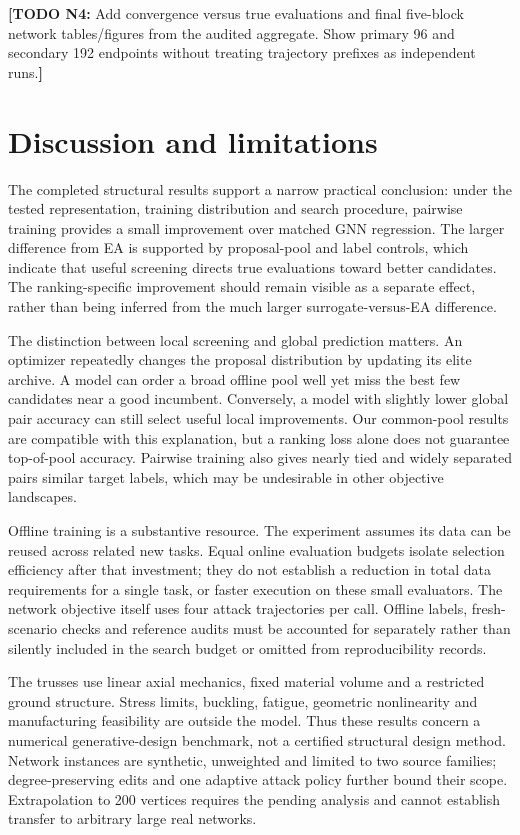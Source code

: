 \documentclass[11pt,a4paper]{article}
\newcommand{\todo}[2]{\textcolor{red!65!black}{\textbf{[TODO #1:} #2\textbf{]}}}
\begin{document}
\todo{N4}{Add convergence versus true evaluations and final five-block network tables/figures from the audited aggregate. Show primary 96 and secondary 192 endpoints without treating trajectory prefixes as independent runs.}

\section{Discussion and limitations}
The completed structural results support a narrow practical conclusion: under the tested representation, training distribution and search procedure, pairwise training provides a small improvement over matched GNN regression. The larger difference from EA is supported by proposal-pool and label controls, which indicate that useful screening directs true evaluations toward better candidates. The ranking-specific improvement should remain visible as a separate effect, rather than being inferred from the much larger surrogate-versus-EA difference.

The distinction between local screening and global prediction matters. An optimizer repeatedly changes the proposal distribution by updating its elite archive. A model can order a broad offline pool well yet miss the best few candidates near a good incumbent. Conversely, a model with slightly lower global pair accuracy can still select useful local improvements. Our common-pool results are compatible with this explanation, but a ranking loss alone does not guarantee top-of-pool accuracy. Pairwise training also gives nearly tied and widely separated pairs similar target labels, which may be undesirable in other objective landscapes.

Offline training is a substantive resource. The experiment assumes its data can be reused across related new tasks. Equal online evaluation budgets isolate selection efficiency after that investment; they do not establish a reduction in total data requirements for a single task, or faster execution on these small evaluators. The network objective itself uses four attack trajectories per call. Offline labels, fresh-scenario checks and reference audits must be accounted for separately rather than silently included in the search budget or omitted from reproducibility records.

The trusses use linear axial mechanics, fixed material volume and a restricted ground structure. Stress limits, buckling, fatigue, geometric nonlinearity and manufacturing feasibility are outside the model. Thus these results concern a numerical generative-design benchmark, not a certified structural design method. Network instances are synthetic, unweighted and limited to two source families; degree-preserving edits and one adaptive attack policy further bound their scope. Extrapolation to 200 vertices requires the pending analysis and cannot establish transfer to arbitrary large real networks.
\end{document}
